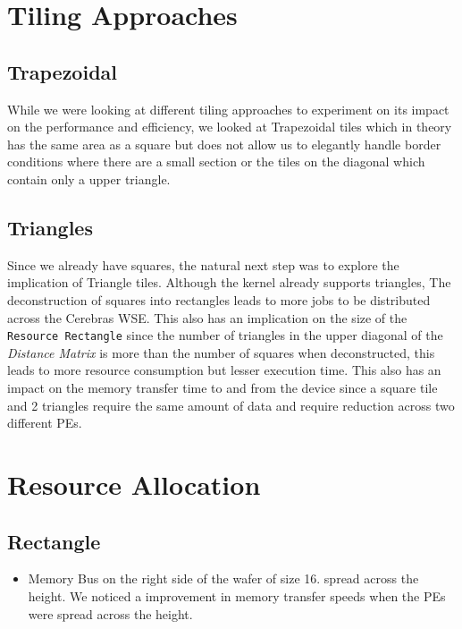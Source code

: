 \section{Tiling Approaches}
\subsection{Trapezoidal}

While we were looking at different tiling approaches to experiment on its impact on the performance and efficiency, we looked at Trapezoidal tiles which in theory has the same area as a square but does not allow us to elegantly handle border conditions where there are a small section or the tiles on the diagonal which contain only a upper triangle.  

\subsection{Triangles}

Since we already have squares, the natural next step was to explore the implication of Triangle tiles. Although the kernel already supports triangles, The deconstruction of squares into rectangles leads to more jobs to be distributed across the Cerebras WSE. This also has an implication on the size of the \texttt{Resource Rectangle} since the number of triangles in the upper diagonal of the \textit{Distance Matrix} is more than the number of squares when deconstructed, this leads to more resource consumption but lesser execution time. This also has an impact on the memory transfer time to and from the device since a square tile and 2 triangles require the same amount of data and require reduction across two different PEs.

\section{Resource Allocation}

\subsection{Rectangle}

\begin{itemize}
    \item Memory Bus on the right side of the wafer of size 16. spread across the height. We noticed a improvement in memory transfer speeds when the PEs were spread across the height.
\end{itemize}

